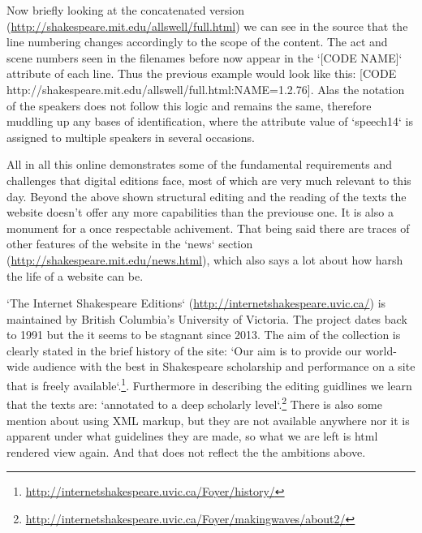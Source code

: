Now briefly looking at the concatenated version (\url{http://shakespeare.mit.edu/allswell/full.html}) we can see in the source that the line numbering changes accordingly to the scope of the content. The act and scene numbers seen in the filenames before now appear in the `[CODE NAME]` attribute of each line. Thus the previous example would look like this: [CODE http://shakespeare.mit.edu/allswell/full.html:NAME=1.2.76]. Alas the notation of the speakers does not follow this logic and remains the same, therefore muddling up any bases of identification, where the attribute value of `speech14` is assigned to multiple speakers in several occasions.

All in all this online demonstrates some of the fundamental requirements and challenges that digital editions face, most of which are very much relevant to this day. Beyond the above shown structural editing and the reading of the texts the website doesn't offer any more capabilities than the previouse one. It is also a monument for a once respectable achivement. That being said there are traces of other features of the website in the `news` section (\url{http://shakespeare.mit.edu/news.html}), which also says a lot about how harsh the life of a website can be.   

`The Internet Shakespeare Editions` (\url{http://internetshakespeare.uvic.ca/}) is maintained by British Columbia's University of Victoria. The project dates back to 1991 but the it seems to be stagnant since 2013. The aim of the collection is clearly stated in the brief history of the site: `Our aim is to provide our world-wide audience with the best in Shakespeare scholarship and performance on a site that is freely available`.\footnote{\url{http://internetshakespeare.uvic.ca/Foyer/history/}}. Furthermore in describing the editing guidlines we learn that the texts are: `annotated to a deep scholarly level`.\footnote{\url{http://internetshakespeare.uvic.ca/Foyer/makingwaves/about2/}} There is also some mention about using XML markup, but they are not available anywhere nor it is apparent under what guidelines they are made, so what we are left is html rendered view again. And that does not reflect the the ambitions above.

